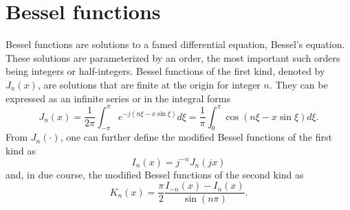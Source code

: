 \documentclass[a4paper, 12pt]{book}
\begin{document}
\section{Bessel functions}
Bessel functions are solutions to a famed differential equation, Bessel's equation. These solutions are parameterized by an order, the most important such orders being integers or half-integers. Bessel functions of the first kind, denoted by $J_{n}(x)$, are solutions that are finite at the origin for integer $n$. They can be expressed as an infinite series or in the integral forms
\begin{equation}
    J_{n}(x)=\frac{1}{2\pi}\int_{-\pi}^{\pi}e^{-j(n\xi-x\sin\xi)}d\xi = \frac{1}{\pi}\int_{0}^{\pi}\cos(n\xi-x\sin\xi)d\xi. \tag{E.15}
\end{equation}
From $J_{n}(\cdot)$, one can further define the modified Bessel functions of the first kind as
\begin{equation}
    I_{n}(x)=j^{-n}J_{n}(jx) \tag{E.17}
\end{equation}
and, in due course, the modified Bessel functions of the second kind as
\begin{equation}
    K_{n}(x)=\frac{\pi}{2}\frac{I_{-n}(x)-I_{n}(x)}{\sin(n\pi)}. \tag{E.18}
\end{equation}
\end{document}
